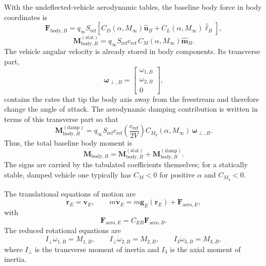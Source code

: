 With the undeflected-vehicle aerodynamic tables, the baseline body force in body coordinates is
\begin{equation}
\mathbf F_{\mathrm{body},B}
=
q_\infty S_{\mathrm{ref}}
\left[
C_D(\alpha,M_\infty)\hat{\mathbf u}_B
+
C_L(\alpha,M_\infty)\hat{\boldsymbol\ell}_B
\right], \label{eq:body_force_baseline}
\end{equation}
\begin{equation}
\mathbf M_{\mathrm{body},B}^{(\mathrm{stat})}
=
q_\infty S_{\mathrm{ref}} c_{\mathrm{ref}}
\,C_M(\alpha,M_\infty)\hat{\mathbf m}_B. \label{eq:body_moment_baseline}
\end{equation}
The vehicle angular velocity is already stored in body components. Its transverse part,
\begin{equation}
\boldsymbol\omega_{\perp,B}
=
\begin{bmatrix}
\omega_{1,B}\\[2pt]\omega_{2,B}\\[2pt]0
\end{bmatrix},
\end{equation}
contains the rates that tip the body axis away from the freestream and therefore change the angle of attack. The aerodynamic damping contribution is written in terms of this transverse part so that
\begin{equation}
\mathbf M_{\mathrm{body},B}^{(\mathrm{damp})}
=
q_\infty S_{\mathrm{ref}} c_{\mathrm{ref}}
\left(\frac{c_{\mathrm{ref}}}{2V}\right)
C_{M_q}(\alpha,M_\infty)\,\boldsymbol\omega_{\perp,B}. \label{eq:aero_damping}
\end{equation}
Thus, the total baseline body moment is
\begin{equation}
\mathbf M_{\mathrm{body},B}
=
\mathbf M_{\mathrm{body},B}^{(\mathrm{stat})}
+
\mathbf M_{\mathrm{body},B}^{(\mathrm{damp})}.
\end{equation}
The signs are carried by the tabulated coefficients themselves; for a statically stable, damped vehicle one typically has \(C_M<0\) for positive \(\alpha\) and \(C_{M_q}<0\).

The translational equations of motion are
\begin{equation}
\dot{\mathbf r}_E=\mathbf v_E,
\qquad
m\dot{\mathbf v}_E
=
m\mathbf g_E(\mathbf r_E)+\mathbf F_{\mathrm{aero},E}, \label{eq:eom_translation}
\end{equation}
with
\begin{equation}
\mathbf F_{\mathrm{aero},E}=C_{EB}\mathbf F_{\mathrm{aero},B}.
\end{equation}
The reduced rotational equations are
\begin{equation}
I_\perp \dot{\omega}_{1,B}=M_{1,B},
\qquad
I_\perp \dot{\omega}_{2,B}=M_{2,B},
\qquad
I_3 \dot{\omega}_{3,B}=M_{3,B}, \label{eq:eom_rotation}
\end{equation}
where \(I_\perp\) is the transverse moment of inertia and \(I_3\) is the axial moment of inertia. 

